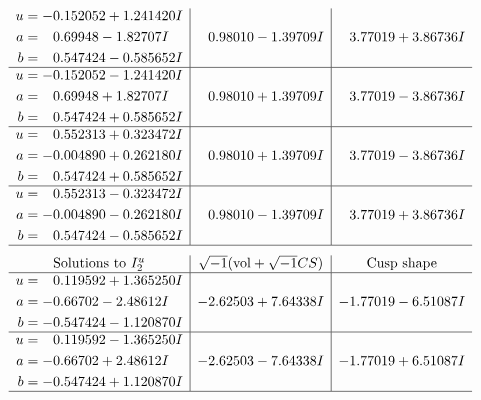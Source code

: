 \documentclass[1p]{elsarticle_modified}
\theoremstyle{definition}
\newcommand{\I}{\sqrt{-1}}
\begin{document}
$$\begin{array}{c|c|c}
\begin{aligned}
u &= -0.152052 + 1.241420 I \\
a &= \phantom{-}0.69948 - 1.82707 I \\
b &= \phantom{-}0.547424 - 0.585652 I\end{aligned}
 & \phantom{-}0.98010 - 1.39709 I & \phantom{-}3.77019 + 3.86736 I \\ \hline\begin{aligned}
u &= -0.152052 - 1.241420 I \\
a &= \phantom{-}0.69948 + 1.82707 I \\
b &= \phantom{-}0.547424 + 0.585652 I\end{aligned}
 & \phantom{-}0.98010 + 1.39709 I & \phantom{-}3.77019 - 3.86736 I \\ \hline\begin{aligned}
u &= \phantom{-}0.552313 + 0.323472 I \\
a &= -0.004890 + 0.262180 I \\
b &= \phantom{-}0.547424 + 0.585652 I\end{aligned}
 & \phantom{-}0.98010 + 1.39709 I & \phantom{-}3.77019 - 3.86736 I \\ \hline\begin{aligned}
u &= \phantom{-}0.552313 - 0.323472 I \\
a &= -0.004890 - 0.262180 I \\
b &= \phantom{-}0.547424 - 0.585652 I\end{aligned}
 & \phantom{-}0.98010 - 1.39709 I & \phantom{-}3.77019 + 3.86736 I\\
 \hline 
 \end{array}$$\newpage$$\begin{array}{c|c|c}  
\text{Solutions to }I^u_{2}& \I (\text{vol} + \sqrt{-1}CS) & \text{Cusp shape}\\
 \hline 
\begin{aligned}
u &= \phantom{-}0.119592 + 1.365250 I \\
a &= -0.66702 - 2.48612 I \\
b &= -0.547424 - 1.120870 I\end{aligned}
 & -2.62503 + 7.64338 I & -1.77019 - 6.51087 I \\ \hline\begin{aligned}
u &= \phantom{-}0.119592 - 1.365250 I \\
a &= -0.66702 + 2.48612 I \\
b &= -0.547424 + 1.120870 I\end{aligned}
 & -2.62503 - 7.64338 I & -1.77019 + 6.51087 I\\
 \hline 
 \end{array}$$\newpage\newpage\renewcommand{\arraystretch}{1}
\end{document}
